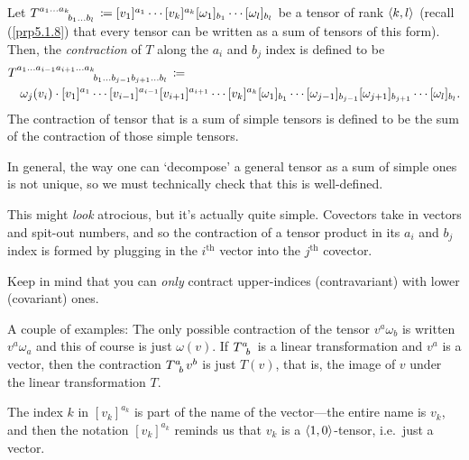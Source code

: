 \begin{dfn}[Contraction]\label{Contraction}
Let $T\indices{^{a_1\ldots a_k}_{b_1\ldots b_l}}\coloneqq [v_1]^{a_1}\cdots [v_k]^{a_k}[\omega _1]_{b_1}\cdots [\omega _l]_{b_l}$ be a tensor of rank $\langle k,l\rangle$ (recall (\cref{prp5.1.8}) that every tensor can be written as a sum of tensors of this form).  Then, the \emph{contraction} of $T$ along the $a_i$ and $b_j$ index is defined to be
\begin{equation}
\begin{multlined}
T\indices{^{a_1\ldots a_{i-1}a_{i+1}\ldots a_k}_{b_1\ldots b_{j-1}b_{j+1}\ldots b_l}}\coloneqq \\ \omega _j(v_i)\cdot [v_1]^{a_1}\cdots [v_{i-1}]^{a_{i-1}}[v_{i+1}]^{a_{i+1}}\cdots [v_k]^{a_k}[\omega _1]_{b_1}\cdots [\omega _{j-1}]_{b_{j-1}}[\omega _{j+1}]_{b_{j+1}}\cdots [\omega _l]_{b_l}.
\end{multlined}
\end{equation}
The contraction of tensor that is a sum of simple tensors is defined to be the sum of the contraction of those simple tensors.
\begin{rmk}
In general, the way one can `decompose' a general tensor as a sum of simple ones is not unique, so we must technically check that this is well-defined.
\end{rmk}
\begin{rmk}
This might \emph{look} atrocious, but it's actually quite simple.  Covectors take in vectors and spit-out numbers, and so the contraction of a tensor product in its $a_i$ and $b_j$ index is formed by plugging in the $i^{\text{th}}$ vector into the $j^{\text{th}}$ covector.
\end{rmk}
\begin{rmk}
Keep in mind that you can \emph{only} contract upper-indices (contravariant) with lower (covariant) ones.
\end{rmk}
\begin{rmk}
A couple of examples:  The only possible contraction of the tensor $v^a\omega _b$ is written $v^a\omega _a$ and this of course is just $\omega (v)$.  If $T\indices{^a_b}$ is a linear transformation and $v^a$ is a vector, then the contraction $T\indices{^a_b}v^b$ is just $T(v)$, that is, the image of $v$ under the linear transformation $T$.
\end{rmk}
\begin{rmk}
The index $k$ in $[v_k]^{a_k}$ is part of the name of the vector---the entire name is $v_k$, and then the notation $[v_k]^{a_k}$ reminds us that $v_k$ is a $\langle1,0\rangle$-tensor, i.e.~just a vector.
\end{rmk}
\end{dfn}
